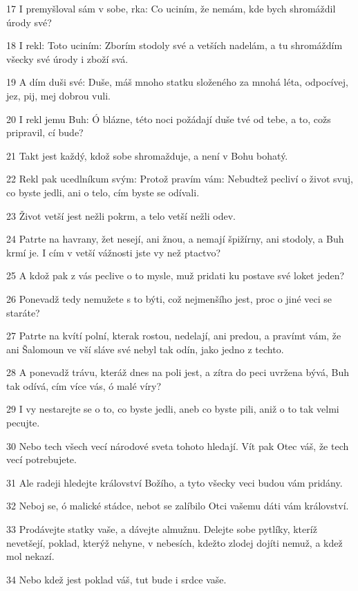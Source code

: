 \par 17 I premyšloval sám v sobe, rka: Co uciním, že nemám, kde bych shromáždil úrody své?
\par 18 I rekl: Toto uciním: Zborím stodoly své a vetších nadelám, a tu shromáždím všecky své úrody i zboží svá.
\par 19 A dím duši své: Duše, máš mnoho statku složeného za mnohá léta, odpocívej, jez, pij, mej dobrou vuli.
\par 20 I rekl jemu Buh: Ó blázne, této noci požádají duše tvé od tebe, a to, cožs pripravil, cí bude?
\par 21 Takt jest každý, kdož sobe shromažduje, a není v Bohu bohatý.
\par 22 Rekl pak ucedlníkum svým: Protož pravím vám: Nebudtež pecliví o život svuj, co byste jedli, ani o telo, cím byste se odívali.
\par 23 Život vetší jest nežli pokrm, a telo vetší nežli odev.
\par 24 Patrte na havrany, žet nesejí, ani žnou, a nemají špižírny, ani stodoly, a Buh krmí je. I cím v vetší vážnosti jste vy než ptactvo?
\par 25 A kdož pak z vás peclive o to mysle, muž pridati ku postave své loket jeden?
\par 26 Ponevadž tedy nemužete s to býti, což nejmenšího jest, proc o jiné veci se staráte?
\par 27 Patrte na kvítí polní, kterak rostou, nedelají, ani predou, a pravímt vám, že ani Šalomoun ve vší sláve své nebyl tak odín, jako jedno z techto.
\par 28 A ponevadž trávu, kteráž dnes na poli jest, a zítra do peci uvržena bývá, Buh tak odívá, cím více vás, ó malé víry?
\par 29 I vy nestarejte se o to, co byste jedli, aneb co byste pili, aniž o to tak velmi pecujte.
\par 30 Nebo tech všech vecí národové sveta tohoto hledají. Vít pak Otec váš, že tech vecí potrebujete.
\par 31 Ale radeji hledejte království Božího, a tyto všecky veci budou vám pridány.
\par 32 Neboj se, ó malické stádce, nebot se zalíbilo Otci vašemu dáti vám království.
\par 33 Prodávejte statky vaše, a dávejte almužnu. Delejte sobe pytlíky, kteríž nevetšejí, poklad, kterýž nehyne, v nebesích, kdežto zlodej dojíti nemuž, a kdež mol nekazí.
\par 34 Nebo kdež jest poklad váš, tut bude i srdce vaše.
